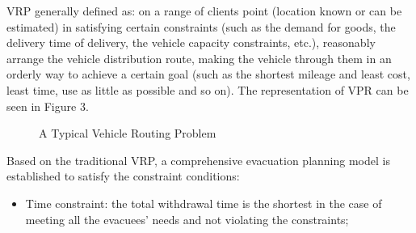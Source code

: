 \documentclass{mcmthesis}	%
\begin{document}
VRP \cite{Dikas2016Solving,He2015Model} generally defined as: on a range of clients point (location known or can be estimated) in satisfying certain constraints (such as the demand for goods, the delivery time of delivery, the vehicle capacity constraints, etc.), reasonably arrange the vehicle distribution route, making the vehicle through them in an orderly way to achieve a certain goal (such as the shortest mileage and least cost, least time, use as little as possible and so on). The representation of VPR can be seen in Figure 3.

\begin{figure}[tbp]
  \caption{A Typical Vehicle Routing Problem}\label{Figure3}
\end{figure}

Based on the traditional VRP, a comprehensive evacuation planning model is established to satisfy the constraint conditions:
\begin{itemize}
  \item Time constraint: the total withdrawal time is the shortest in the case of meeting all the evacuees' needs and not violating the constraints;
\end{itemize}

\end{document}
